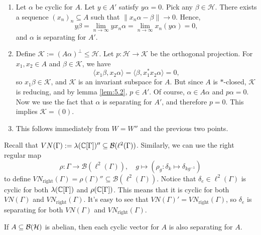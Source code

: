 \begin{myproof}
  \begin{enumerate}
    \item Let $\alpha$ be cyclic for $A$. Let $y \in A'$ satisfy $y \alpha = 0$.
    Pick any $\beta \in \mathcal{H}$. There exists a sequence $(x_n)_n \subseteq A$ such that $\|x_n \alpha - \beta\| \to 0$.
    Hence, $$y \beta = \lim_{n \to \infty} yx_n \alpha = \lim_{n \to \infty} x_n (y\alpha) = 0,$$
    and $\alpha$ is separating for $A'$.
    \item Define $\mathcal{K} := (A \alpha)^{\perp} \leq \mathcal{H}$.
    Let $p: \mathcal{H} \to \mathcal{K}$ be the orthogonal projection.
    For $x_1, x_2 \in A$ and $\beta \in \mathcal{K}$, we have 
    $$\langle x_1 \beta, x_2 \alpha\rangle = \langle \beta, x_1 ^* x_2 \alpha \rangle = 0,$$
    so $x_1 \beta \in \mathcal{K}$, and $\mathcal{K}$ is an invariant subspace for $A$.
    But since $A$ is $*$-closed, $\mathcal{K}$ is reducing, and by lemma \ref{lem:5.2}, $p \in A'$.
    Of course, $\alpha \in A \alpha$ and $p\alpha = 0$. Now we use the fact that $\alpha$ is 
    separating for $A'$, and therefore $p = 0$. This implies $\mathcal{K} = (0)$.
    \item This follows immediately from $W = W''$ and the previous two points. \qedhere
  \end{enumerate}
\end{myproof}

\begin{example}
  Recall that $VN (\Gamma) := \lambda (\mathbb {C} [\Gamma])'' \subseteq \mathcal{B} (\ell^2 (\Gamma))$.
  Similarly, we can use the right regular map 
  $$\rho: \Gamma \to \mathcal{B} (\ell^2 (\Gamma)),\quad g \mapsto (\rho_g: \delta_k \mapsto \delta_{kg^{-1}})$$
  to define $VN_{\mathrm{right}} (\Gamma) = \rho(\Gamma)'' \subseteq \mathcal{B} (\ell^2 (\Gamma))$.
  Notice that $\delta_e \in \ell^2 (\Gamma)$ is cyclic for both $\lambda (\mathbb {C} [\Gamma])$ and $\rho(\mathbb {C}[\Gamma])$.
  This means that it is cyclic for both $VN(\Gamma)$ and $VN_{\mathrm{right}} (\Gamma)$.
  It's easy to see that $VN(\Gamma)' = VN_{\mathrm{right}} (\Gamma)$, so $\delta_e$
  is separating for both $VN(\Gamma)$ and $VN_{\mathrm{right}} (\Gamma)$.
\end{example}

\begin{corollary}
  If $A \subseteq \operatorname{\mathcal{B} (\mathcal{H})}$ is abelian, then each cyclic vector for $A$ is also separating for $A$.
\end{corollary}

